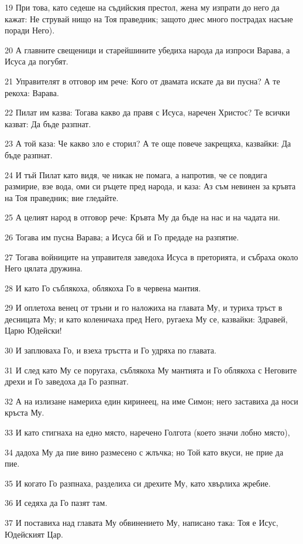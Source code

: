 \par 19 При това, като седеше на съдийския престол, жена му изпрати до него да кажат: Не струвай нищо на Тоя праведник; защото днес много пострадах насъне поради Него).
\par 20 А главните свещеници и старейшините убедиха народа да изпроси Варава, а Исуса да погубят.
\par 21 Управителят в отговор им рече: Кого от двамата искате да ви пусна? А те рекоха: Варава.
\par 22 Пилат им казва: Тогава какво да правя с Исуса, наречен Христос? Те всички казват: Да бъде разпнат.
\par 23 А той каза: Че какво зло е сторил? А те още повече закрещяха, казвайки: Да бъде разпнат.
\par 24 И тъй Пилат като видя, че никак не помага, а напротив, че се повдига размирие, взе вода, оми си ръцете пред народа, и каза: Аз съм невинен за кръвта на Тоя праведник; вие гледайте.
\par 25 А целият народ в отговор рече: Кръвта Му да бъде на нас и на чадата ни.
\par 26 Тогава им пусна Варава; а Исуса бй и Го предаде на разпятие.
\par 27 Тогава войниците на управителя заведоха Исуса в преторията, и събраха около Него цялата дружина.
\par 28 И като Го съблякоха, облякоха Го в червена мантия.
\par 29 И оплетоха венец от тръни и го наложиха на главата Му, и туриха тръст в десницата Му; и като коленичаха пред Него, ругаеха Му се, казвайки: Здравей, Царю Юдейски!
\par 30 И заплюваха Го, и взеха тръстта и Го удряха по главата.
\par 31 И след като Му се поругаха, съблякоха Му мантията и Го облякоха с Неговите дрехи и Го заведоха да Го разпнат.
\par 32 А на излизане намериха един киринеец, на име Симон; него заставиха да носи кръста Му.
\par 33 И като стигнаха на едно място, наречено Голгота (което значи лобно място),
\par 34 дадоха Му да пие вино размесено с жлъчка; но Той като вкуси, не прие да пие.
\par 35 И когато Го разпнаха, разделиха си дрехите Му, като хвърлиха жребие.
\par 36 И седяха да Го пазят там.
\par 37 И поставиха над главата Му обвинението Му, написано така: Тоя е Исус, Юдейският Цар.
